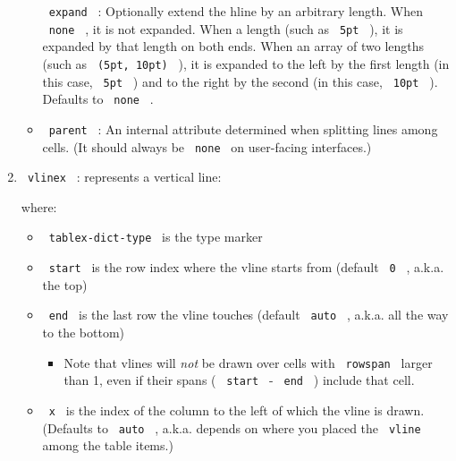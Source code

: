 \begin{enumerate}
\begin{itemize}
    \texttt{\ expand\ } : Optionally extend the hline by an arbitrary
    length. When \texttt{\ none\ } , it is not expanded. When a length
    (such as \texttt{\ 5pt\ } ), it is expanded by that length on both
    ends. When an array of two lengths (such as
    \texttt{\ (5pt,\ 10pt)\ } ), it is expanded to the left by the first
    length (in this case, \texttt{\ 5pt\ } ) and to the right by the
    second (in this case, \texttt{\ 10pt\ } ). Defaults to
    \texttt{\ none\ } .
  \item
    \texttt{\ parent\ } : An internal attribute determined when
    splitting lines among cells. (It should always be \texttt{\ none\ }
    on user-facing interfaces.)
  \end{itemize}
\item
  \texttt{\ vlinex\ } : represents a vertical line:

\begin{Shaded}
\begin{Highlighting}[]
\NormalTok{) = (}
\NormalTok{)}
\end{Highlighting}
\end{Shaded}

  where:

  \begin{itemize}
  \tightlist
  \item
    \texttt{\ tablex-dict-type\ } is the type marker
  \item
    \texttt{\ start\ } is the row index where the vline starts from
    (default \texttt{\ 0\ } , a.k.a. the top)
  \item
    \texttt{\ end\ } is the last row the vline touches (default
    \texttt{\ auto\ } , a.k.a. all the way to the bottom)

    \begin{itemize}
    \tightlist
    \item
      Note that vlines will \emph{not} be drawn over cells with
      \texttt{\ rowspan\ } larger than 1, even if their spans (
      \texttt{\ start\ } - \texttt{\ end\ } ) include that cell.
    \end{itemize}
  \item
    \texttt{\ x\ } is the index of the column to the left of which the
    vline is drawn. (Defaults to \texttt{\ auto\ } , a.k.a. depends on
    where you placed the \texttt{\ vline\ } among the table items.)


\end{itemize}
\end{enumerate}

